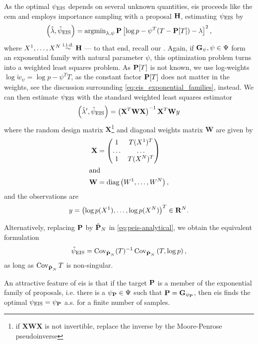 As the optimal $\peis$ depends on several unknown quantities, \gls{eis} proceeds like the \gls{cem} and employs importance sampling with a proposal $\H$, estimating $\peis$ by
$$
\left(\hat \lambda,\hat \psi_{\text{EIS}}\right) = \argmin_{\lambda,\psi} \P \left[ \log p - \psi^{T}(T - \P [T]) - \lambda \right]^{2},
$$
where $X^{1}, \dots, X^{N} \iid \H$ --- to that end, recall our . 
Again, if $\G_{\psi}, \psi \in \Psi$ form an exponential family with natural parameter $\psi$, this optimization problem turns into a weighted least squares problem. As $\P[T]$ is not known, we use log-weights $\log\tilde w_{\psi} = \log p - \psi^{T}T$, as the constant factor $\P[T]$ does not matter in the weights, see the discussion surrounding \eqref{eq:eis_exponential_families}, instead.
We can then estimate $\peis$ with the standard weighted least squares estimator
$$
\left( \hat\lambda', \hpeis \right) = \left(\mathbf X^{T}\mathbf W\mathbf X\right)^{-1}\mathbf X^{T}\mathbf W y%
$$
where the random design matrix $\mathbf X$\footnote{if $\mathbf X\mathbf W \mathbf X$ is not invertible, replace the inverse by the Moore-Penrose pseudoinverse} and diagonal weights matrix $\mathbf W$ are given by
\begin{align*}
\mathbf X &= \begin{pmatrix}
    1 & T(X^{1})^{T} \\
    \dots&\dots\\
    1 & T(X^{N})^{T} \\
\end{pmatrix}\\
\intertext{and}
\mathbf W &= \text{diag} \left( W^{1}, \dots, W^{N} \right),
\end{align*}
and the observations are 
\begin{align*}
y = \left( \log p(X^{1}), \dots, \log p(X^{N}) \right)^{T} \in \R^{N}.
\end{align*}

Alternatively, replacing $\P$ by $\hat\P_{N}$ in \eqref{eq:peis-analytical}, we obtain the equivalent formulation
\begin{align}
    \label{eq:hpeis-cov}
    \hpeis = \cov_{\hat\P_{N}} (T)^{-1} \cov_{\hat \P_{N}} \left( T, \log p \right),
\end{align}
as long as $\cov_{\hat \P_{N}} T$ is non-singular.

An attractive feature of \gls{eis} is that if the target $\P$ is a member of the exponential family of proposals, i.e. there is a $\psi_{\P}\in\Psi$ such that $\P = \G_{\psi_{\P}}$, then \gls{eis} finds the optimal $\peis = \psi_{\P}$ a.s. for a finite number of samples.

